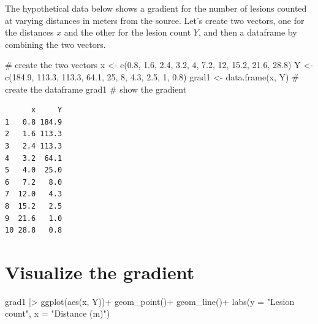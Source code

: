 \documentclass[
  letterpaper,
  DIV=11,
  numbers=noendperiod]{scrreprt}
\newenvironment{Shaded}{\begin{snugshade}}{\end{snugshade}}
\newcommand{\AttributeTok}[1]{\textcolor[rgb]{0.40,0.45,0.13}{#1}}
\newcommand{\CommentTok}[1]{\textcolor[rgb]{0.37,0.37,0.37}{#1}}
\newcommand{\DecValTok}[1]{\textcolor[rgb]{0.68,0.00,0.00}{#1}}
\newcommand{\FloatTok}[1]{\textcolor[rgb]{0.68,0.00,0.00}{#1}}
\newcommand{\FunctionTok}[1]{\textcolor[rgb]{0.28,0.35,0.67}{#1}}
\newcommand{\NormalTok}[1]{\textcolor[rgb]{0.00,0.23,0.31}{#1}}
\newcommand{\OtherTok}[1]{\textcolor[rgb]{0.00,0.23,0.31}{#1}}
\newcommand{\SpecialCharTok}[1]{\textcolor[rgb]{0.37,0.37,0.37}{#1}}
\newcommand{\StringTok}[1]{\textcolor[rgb]{0.13,0.47,0.30}{#1}}
\begin{document}
The hypothetical data below shows a gradient for the number of lesions
counted at varying distances in meters from the source. Let's create two
vectors, one for the distances \(x\) and the other for the lesion count
\(Y\), and then a dataframe by combining the two vectors.

\begin{Shaded}
\begin{Highlighting}[]
\CommentTok{\# create the two vectors}
\NormalTok{x }\OtherTok{\textless{}{-}} \FunctionTok{c}\NormalTok{(}\FloatTok{0.8}\NormalTok{, }\FloatTok{1.6}\NormalTok{, }\FloatTok{2.4}\NormalTok{, }\FloatTok{3.2}\NormalTok{, }\DecValTok{4}\NormalTok{, }\FloatTok{7.2}\NormalTok{, }\DecValTok{12}\NormalTok{, }\FloatTok{15.2}\NormalTok{, }\FloatTok{21.6}\NormalTok{, }\FloatTok{28.8}\NormalTok{)}
\NormalTok{Y }\OtherTok{\textless{}{-}} \FunctionTok{c}\NormalTok{(}\FloatTok{184.9}\NormalTok{, }\FloatTok{113.3}\NormalTok{, }\FloatTok{113.3}\NormalTok{, }\FloatTok{64.1}\NormalTok{, }\DecValTok{25}\NormalTok{, }\DecValTok{8}\NormalTok{, }\FloatTok{4.3}\NormalTok{, }\FloatTok{2.5}\NormalTok{, }\DecValTok{1}\NormalTok{, }\FloatTok{0.8}\NormalTok{)}
\NormalTok{grad1 }\OtherTok{\textless{}{-}} \FunctionTok{data.frame}\NormalTok{(x, Y) }\CommentTok{\# create the dataframe}
\NormalTok{grad1 }\CommentTok{\# show the gradient}
\end{Highlighting}
\end{Shaded}

\begin{verbatim}
      x     Y
1   0.8 184.9
2   1.6 113.3
3   2.4 113.3
4   3.2  64.1
5   4.0  25.0
6   7.2   8.0
7  12.0   4.3
8  15.2   2.5
9  21.6   1.0
10 28.8   0.8
\end{verbatim}

\hypertarget{visualize-the-gradient}{%
\section{Visualize the gradient}\label{visualize-the-gradient}}

\begin{Shaded}
\begin{Highlighting}[]
\NormalTok{grad1 }\SpecialCharTok{|\textgreater{}} 
  \FunctionTok{ggplot}\NormalTok{(}\FunctionTok{aes}\NormalTok{(x, Y))}\SpecialCharTok{+}
  \FunctionTok{geom\_point}\NormalTok{()}\SpecialCharTok{+}
  \FunctionTok{geom\_line}\NormalTok{()}\SpecialCharTok{+}
  \FunctionTok{labs}\NormalTok{(}\AttributeTok{y =} \StringTok{"Lesion count"}\NormalTok{,}
       \AttributeTok{x =} \StringTok{"Distance (m)"}\NormalTok{)}
\end{Highlighting}
\end{Shaded}
\end{document}

